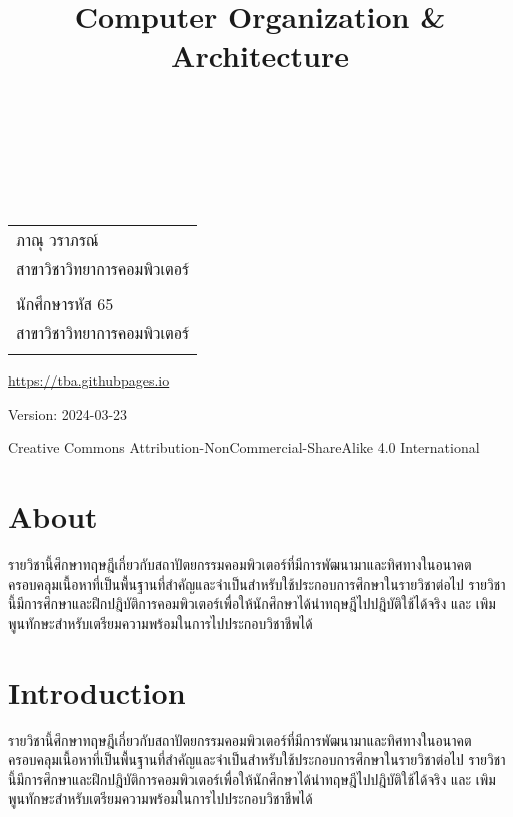 \documentclass[
  notoc %
]{tufte-book}
\title{Computer Organization \& Architecture}
\author{\noindent{ภาณุ วราภรณ์}\\[3mm] \noindent{นักศึกษารหัส 65}\\[3mm] }
\date{}
\begin{document}
\makeatletter
\thispagestyle{empty}
\vfill
{\Huge\bf
\noindent
\@title
}\\[1in]
{\Large
\noindent
\@author
}
\makeatother

\makeatletter
\newpage
\thispagestyle{empty}
\vfill
{\noindent
\begin{tabular}{l} ภาณุ วราภรณ์\\ สาขาวิชาวิทยาการคอมพิวเตอร์\\ \\ นักศึกษารหัส 65\\ สาขาวิชาวิทยาการคอมพิวเตอร์\\ \\ \end{tabular}
}
\vfill
{\small
\url{https://tba.githubpages.io}

Version: 2024-03-23

Creative Commons Attribution-NonCommercial-ShareAlike 4.0 International
}
\makeatother


\frontmatter
\mainmatter
{}

\setcounter{tocdepth}{1}
\tableofcontents

\justifying

\setlength{\parindent}{0pt}

\hypertarget{about}{%
\chapter*{About}\label{about}}

รายวิชานี้ศึกษาทฤษฎีเกี่ยวกับสถาปัตยกรรมคอมพิวเตอร์ที่มีการพัฒนามาและทิศทางในอนาคต
ครอบคลุมเนื้อหาที่เป็นพื้นฐานที่สำคัญและจำเป็นสำหรับใช้ประกอบการศึกษาในรายวิชาต่อไป
รายวิชานี้มีการศึกษาและฝึกปฎิบัติการคอมพิวเตอร์เพื่อให้นักศึกษาได้นำทฤษฎีไปปฎิบัติใช้ได้จริง และ
เพิมพูนทักษะสำหรับเตรียมความพร้อมในการไปประกอบวิชาชีพได้

\hypertarget{sec:intro}{%
\chapter{Introduction}\label{sec:intro}}

รายวิชานี้ศึกษาทฤษฎีเกี่ยวกับสถาปัตยกรรมคอมพิวเตอร์ที่มีการพัฒนามาและทิศทางในอนาคต
ครอบคลุมเนื้อหาที่เป็นพื้นฐานที่สำคัญและจำเป็นสำหรับใช้ประกอบการศึกษาในรายวิชาต่อไป
รายวิชานี้มีการศึกษาและฝึกปฎิบัติการคอมพิวเตอร์เพื่อให้นักศึกษาได้นำทฤษฎีไปปฎิบัติใช้ได้จริง และ
เพิมพูนทักษะสำหรับเตรียมความพร้อมในการไปประกอบวิชาชีพได้
\end{document}
